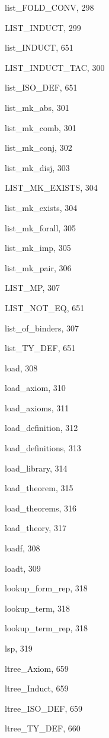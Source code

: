 \begin{theindex}
  \item {\ptt list\_FOLD\_CONV}, 298
  \item {\ptt LIST\_INDUCT}, 299
  \item {\ptt list\_INDUCT}, 651
  \item {\ptt LIST\_INDUCT\_TAC}, 300
  \item {\ptt list\_ISO\_DEF}, 651
  \item {\ptt list\_mk\_abs}, 301
  \item {\ptt list\_mk\_comb}, 301
  \item {\ptt list\_mk\_conj}, 302
  \item {\ptt list\_mk\_disj}, 303
  \item {\ptt LIST\_MK\_EXISTS}, 304
  \item {\ptt list\_mk\_exists}, 304
  \item {\ptt list\_mk\_forall}, 305
  \item {\ptt list\_mk\_imp}, 305
  \item {\ptt list\_mk\_pair}, 306
  \item {\ptt LIST\_MP}, 307
  \item {\ptt LIST\_NOT\_EQ}, 651
  \item {\ptt list\_of\_binders}, 307
  \item {\ptt list\_TY\_DEF}, 651
  \item {\ptt load}, 308
  \item {\ptt load\_axiom}, 310
  \item {\ptt load\_axioms}, 311
  \item {\ptt load\_definition}, 312
  \item {\ptt load\_definitions}, 313
  \item {\ptt load\_library}, 314
  \item {\ptt load\_theorem}, 315
  \item {\ptt load\_theorems}, 316
  \item {\ptt load\_theory}, 317
  \item {\ptt loadf}, 308
  \item {\ptt loadt}, 309
  \item {\ptt lookup\_form\_rep}, 318
  \item {\ptt lookup\_term}, 318
  \item {\ptt lookup\_term\_rep}, 318
  \item {\ptt lsp}, 319
  \item {\ptt ltree\_Axiom}, 659
  \item {\ptt ltree\_Induct}, 659
  \item {\ptt ltree\_ISO\_DEF}, 659
  \item {\ptt ltree\_TY\_DEF}, 660


\end{theindex}

